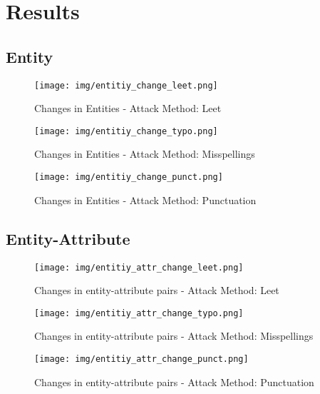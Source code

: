 
\section{Results}
\subsection{Entity}
\begin{figure}
    \centering
    \texttt{[image: img/entitiy\_change\_leet.png]}
    \caption{Changes in Entities - Attack Method: Leet}
    \label{fig:entity_change_leet}
\end{figure}

\begin{figure}
    \centering
    \texttt{[image: img/entitiy\_change\_typo.png]}
    \caption{Changes in Entities - Attack Method: Misspellings}
    \label{fig:entity_change_typo}
\end{figure}

\begin{figure}
    \centering
    \texttt{[image: img/entitiy\_change\_punct.png]}
    \caption{Changes in Entities - Attack Method: Punctuation}
    \label{fig:entity_change_punct}
\end{figure}

\subsection{Entity-Attribute}
\begin{figure}
    \centering
    \texttt{[image: img/entitiy\_attr\_change\_leet.png]}
    \caption{Changes in entity-attribute pairs - Attack Method: Leet}
    \label{fig:entity_attr_change_leet}
\end{figure}

\begin{figure}
    \centering
    \texttt{[image: img/entitiy\_attr\_change\_typo.png]}
    \caption{Changes in entity-attribute pairs - Attack Method: Misspellings}
    \label{fig:entity_attr_change_typo}
\end{figure}

\begin{figure}
    \centering
    \texttt{[image: img/entitiy\_attr\_change\_punct.png]}
    \caption{Changes in entity-attribute pairs - Attack Method: Punctuation}
    \label{fig:entity_attr_change_punct}
\end{figure}